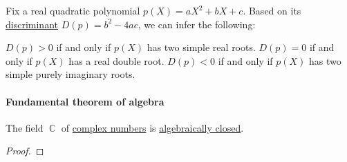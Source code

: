 \begin{corollary}\label{thm:real_quadratic_discriminant}
  Fix a real quadratic polynomial \( p(X) = a X^2 + b X + c \). Based on its \hyperref[def:discriminant]{discriminant} \( D(p) = b^2 - 4ac \), we can infer the following:
  \begin{thmenum}
     \( D(p) > 0 \) if and only if \( p(X) \) has two simple real roots.
     \( D(p) = 0 \) if and only if \( p(X) \) has a real double root.
     \( D(p) < 0 \) if and only if \( p(X) \) has two simple purely imaginary roots.
  \end{thmenum}
\end{corollary}

\paragraph{Fundamental theorem of algebra}

\begin{theorem}\label{thm:fundamental_theorem_of_algebra}
  The field \( \BbbC \) of \hyperref[def:complex_numbers]{complex numbers} is \hyperref[def:algebraically_closed_field]{algebraically closed}.
\end{theorem}
\begin{proof}
\end{proof}
